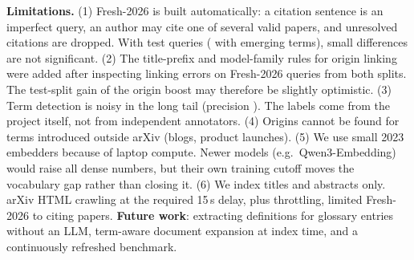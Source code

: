 \textbf{Limitations.}
(1) Fresh-2026 is built automatically: a citation sentence is an imperfect query, an
author may cite one of several valid papers, and unresolved citations are dropped.
With \NTest{} test queries (\NTermQ{} with emerging terms), small differences are not
significant.
(2) The title-prefix and model-family rules for origin linking were added after
inspecting linking errors on Fresh-2026 queries from both splits. The test-split
gain of the origin boost may therefore be slightly optimistic.
(3) Term detection is noisy in the long tail (precision \RandP{}). The labels
come from the project itself, not from independent annotators.
(4) Origins cannot be found for terms introduced outside arXiv (blogs, product
launches).
(5) We use small 2023 embedders because of laptop compute. Newer models (e.g.\
Qwen3-Embedding) would raise all dense numbers, but their own training cutoff moves
the vocabulary gap rather than closing it.
(6) We index titles and abstracts only. arXiv HTML crawling at the required 15\,s
delay, plus throttling, limited Fresh-2026 to \NPapers{} citing papers.
\textbf{Future work}: extracting definitions for glossary entries without an LLM,
term-aware document expansion at index time, and a continuously refreshed benchmark.
